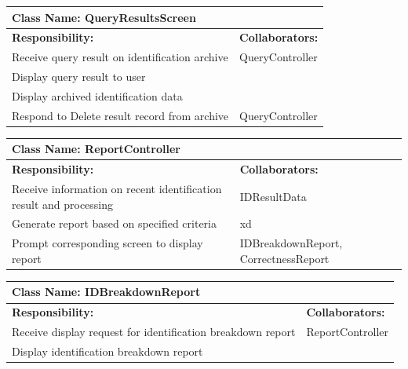 \documentclass[]{article}
\begin{document}
\newpage
	\begin{table}[ht]
		\centering
		\begin{tabular}{|p{5cm}|p{5cm}|}
		\hline 
		 \multicolumn{2}{|l|}{\textbf{Class Name: QueryResultsScreen}} \\
		\hline
		\textbf{Responsibility:} & \textbf{Collaborators:} \\
		\hline
		Receive query result on identification archive & QueryController \\
		\hline
		Display query result to user &  \\
		\hline
		Display archived identification data &  \\
		\hline
		Respond to Delete result record from archive & QueryController \\
		\hline
		\end{tabular}
	\end{table}
	
	\begin{table}[ht]
		\centering
		\begin{tabular}{|p{5cm}|p{5cm}|}
		\hline 
		 \multicolumn{2}{|l|}{\textbf{Class Name: ReportController}} \\
		\hline
		\textbf{Responsibility:} & \textbf{Collaborators:} \\
		\hline
		Receive information on recent identification result and processing & IDResultData \\
		\hline
		Generate report based on specified criteria & xd \\
		\hline
		Prompt corresponding screen to display report & IDBreakdownReport, CorrectnessReport \\
		\hline
		\end{tabular}
	\end{table}
	
	\begin{table}[ht]
		\centering
		\begin{tabular}{|p{5cm}|p{5cm}|}
		\hline 
		 \multicolumn{2}{|l|}{\textbf{Class Name: IDBreakdownReport}} \\
		\hline
		\textbf{Responsibility:} & \textbf{Collaborators:} \\
		\hline
		Receive display request for identification breakdown report & ReportController \\
		\hline
		Display identification breakdown report &  \\
		\hline
		\end{tabular}
	\end{table}
	
\end{document}
